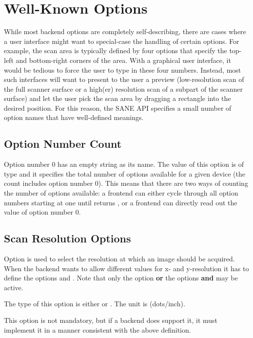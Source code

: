 \documentclass[11pt,DVIps]{report}
\begin{document}
\section{Well-Known Options}

While most backend options are completely self-describing, there are
cases where a user interface might want to special-case the handling
of certain options.  For example, the scan area is typically defined
by four options that specify the top-left and bottom-right corners of
the area.  With a graphical user interface, it would be tedious to
force the user to type in these four numbers.  Instead, most such
interfaces will want to present to the user a preview (low-resolution
scan of the full scanner surface or a high(er) resolution scan of a subpart
of the scanner surface) and let the user pick the scan area by
dragging a rectangle into the desired position.  For this reason, the
SANE API specifies a small number of option names that have
well-defined meanings.

\subsection{Option Number Count}

Option number 0 has an empty string as its name.  The value of this
option is of type  and it specifies the total
number of options available for a given device (the count includes
option number 0).  This means that there are two ways of counting the
number of options available: a frontend can either cycle through all
option numbers starting at one until
 returns , or a
frontend can directly read out the value of option number 0.

\subsection{Scan Resolution Options}

\begin{changebar}
Option  is used to select the resolution at which an
image should be acquired. When the backend wants to allow different
values for x- and y-resolution it has to define the options
 and . Note that only
the option  {\bf or} the options
 {\bf and}  may be active.

The type of this option is either  or
.  The unit is  (dots/inch).

This option is not mandatory, but if a backend does support it, it
must implement it in a manner consistent with the above definition.
\end{changebar}
\end{document}
